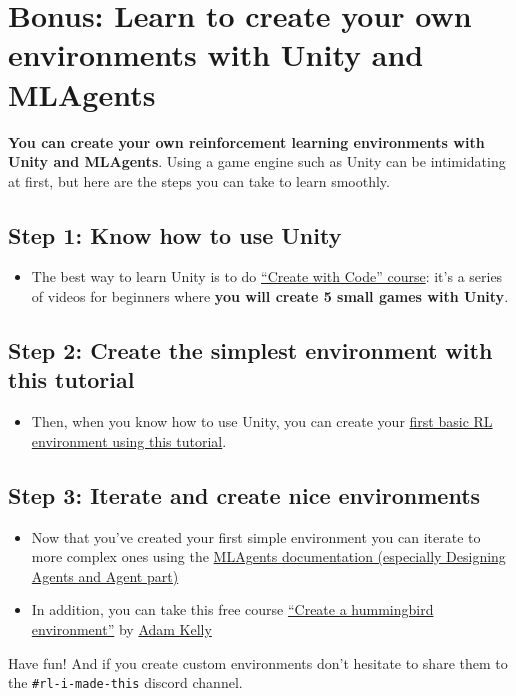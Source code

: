 \documentclass[11pt,a4paper]{article}
\begin{document}
\section{Bonus: Learn to create your own environments with Unity and MLAgents}\label{bonus-learn-to-create-your-own-environments-with-unity-and-mlagents}

\textbf{You can create your own reinforcement learning environments with Unity and MLAgents}. Using a game engine such as Unity can be intimidating at first, but here are the steps you can take to learn smoothly.

\subsection{Step 1: Know how to use Unity}\label{step-1-know-how-to-use-unity}

\begin{itemize}
\tightlist
\item
  The best way to learn Unity is to do \href{https://learn.unity.com/course/create-with-code}{``Create with Code'' course}: it's a series of videos for beginners where \textbf{you will create 5 small games with Unity}.
\end{itemize}

\subsection{Step 2: Create the simplest environment with this tutorial}\label{step-2-create-the-simplest-environment-with-this-tutorial}

\begin{itemize}
\tightlist
\item
  Then, when you know how to use Unity, you can create your \href{https://github.com/Unity-Technologies/ml-agents/blob/release_20_docs/docs/Learning-Environment-Create-New.md}{first basic RL environment using this tutorial}.
\end{itemize}

\subsection{Step 3: Iterate and create nice environments}\label{step-3-iterate-and-create-nice-environments}

\begin{itemize}
\tightlist
\item
  Now that you've created your first simple environment you can iterate to more complex ones using the \href{https://github.com/Unity-Technologies/ml-agents/blob/release_20_docs/docs/}{MLAgents documentation (especially Designing Agents and Agent part)}
\item
  In addition, you can take this free course \href{https://learn.unity.com/course/ml-agents-hummingbirds}{``Create a hummingbird environment''} by \href{https://twitter.com/aktwelve}{Adam Kelly}
\end{itemize}

Have fun! And if you create custom environments don't hesitate to share them to the \texttt{\#rl-i-made-this} discord channel.
\end{document}
